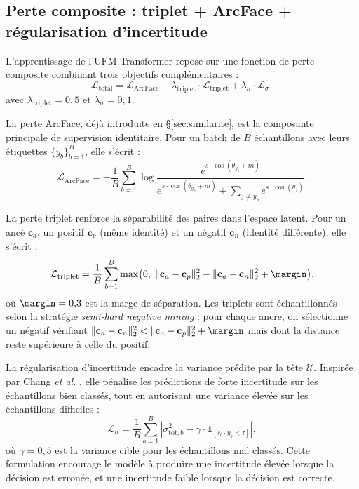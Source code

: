 \documentclass[12pt,a4paper]{report}
\begin{document}
\subsection{Perte composite : triplet + ArcFace + r\'{e}gularisation d'incertitude}

L'apprentissage de l'UFM-Transformer repose sur une fonction de perte composite combinant trois objectifs compl\'{e}mentaires :
\begin{equation}
\label{eq:perte-totale}
\mathcal{L}_{\text{total}} = \mathcal{L}_{\text{ArcFace}} + \lambda_{\text{triplet}} \cdot \mathcal{L}_{\text{triplet}} + \lambda_{\sigma} \cdot \mathcal{L}_{\sigma},
\end{equation}
avec $\lambda_{\text{triplet}} = 0{,}5$ et $\lambda_{\sigma} = 0{,}1$.

La perte ArcFace, d\'{e}j\`{a} introduite en \S\ref{sec:similarite}, est la composante principale de supervision identitaire. Pour un batch de $B$ \'{e}chantillons avec leurs \'{e}tiquettes $\{y_b\}_{b=1}^B$, elle s'\'{e}crit :
\begin{equation}
\mathcal{L}_{\text{ArcFace}} = -\frac{1}{B} \sum_{b=1}^B \log \frac{e^{s \cdot \cos(\theta_{y_b} + m)}}{e^{s \cdot \cos(\theta_{y_b} + m)} + \sum_{j \neq y_b} e^{s \cdot \cos(\theta_j)}}.
\end{equation}

La perte triplet renforce la s\'{e}parabilit\'{e} des paires dans l'espace latent. Pour un anc\`{e} $\mathbf{c}_a$, un positif $\mathbf{c}_p$ (m\^{e}me identit\'{e}) et un n\'{e}gatif $\mathbf{c}_n$ (identit\'{e} diff\'{e}rente), elle s'\'{e}crit :
\begin{equation}
\label{eq:perte-triplet}
\mathcal{L}_{\text{triplet}} = \frac{1}{B} \sum_{b=1}^B \max\bigl(0, \; \|\mathbf{c}_a - \mathbf{c}_p\|_2^2 - \|\mathbf{c}_a - \mathbf{c}_n\|_2^2 + \margin\bigr),
\end{equation}
o\`{u} $\margin = 0{,}3$ est la marge de s\'{e}paration. Les triplets sont \'{e}chantillonn\'{e}s selon la strat\'{e}gie \emph{semi-hard negative mining} : pour chaque ancre, on s\'{e}lectionne un n\'{e}gatif v\'{e}rifiant $\|\mathbf{c}_a - \mathbf{c}_n\|_2^2 < \|\mathbf{c}_a - \mathbf{c}_p\|_2^2 + \margin$ mais dont la distance reste sup\'{e}rieure \`{a} celle du positif.

La r\'{e}gularisation d'incertitude encadre la variance pr\'{e}dite par la t\^{e}te $\mathcal{U}$. Inspir\'{e}e par Chang \textit{et al.} \cite{chang2020data}, elle p\'{e}nalise les pr\'{e}dictions de forte incertitude sur les \'{e}chantillons bien class\'{e}s, tout en autorisant une variance \'{e}lev\'{e}e sur les \'{e}chantillons difficiles :
\begin{equation}
\label{eq:perte-sigma}
\mathcal{L}_{\sigma} = \frac{1}{B} \sum_{b=1}^B \left| \sigma^2_{\text{tot},b} - \gamma \cdot \mathbb{1}_{[s_b \cdot y_b < \tau]} \right|,
\end{equation}
o\`{u} $\gamma = 0{,}5$ est la variance cible pour les \'{e}chantillons mal class\'{e}s. Cette formulation encourage le mod\`{e}le \`{a} produire une incertitude \'{e}lev\'{e}e lorsque la d\'{e}cision est erron\'{e}e, et une incertitude faible lorsque la d\'{e}cision est correcte.
\end{document}
